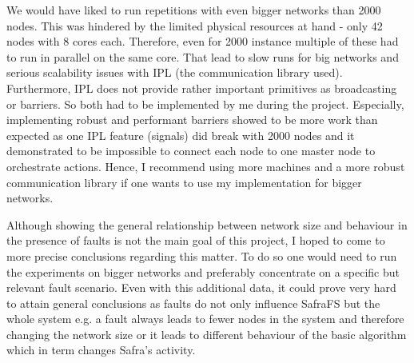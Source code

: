 We would have liked to run repetitions with even bigger networks than 2000 nodes.
This was hindered by the limited physical resources at hand - only 42 nodes with 8 cores each.
Therefore, even for 2000 instance multiple of these had to run in parallel on the same core. 
That lead to slow runs for big networks and serious scalability issues with IPL (the communication library used).
Furthermore, IPL does not provide rather important primitives as broadcasting or barriers.
So both had to be implemented by me during the project.
Especially, implementing robust and performant barriers showed to be more work than expected as one IPL feature (signals) did break with 2000 nodes and it demonstrated to be impossible to connect each node to one master node to orchestrate actions.
Hence, I recommend using more machines and a more robust communication library if one wants to use my implementation for bigger networks.

Although showing the general relationship between network size and behaviour in the presence of faults is not the main goal of this project, I hoped to come to more precise conclusions regarding this matter.
To do so one would need to run the experiments on bigger networks and preferably concentrate on a specific but relevant fault scenario.
Even with this additional data, it could prove very hard to attain general conclusions as faults do not only influence SafraFS but the whole system e.g. a fault always leads to fewer nodes in the system and therefore changing the network size or it leads to different behaviour of the basic algorithm which in term changes Safra's activity.
